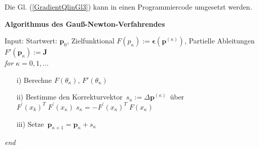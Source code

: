 Die Gl. (\ref{GradientQlinGl3}) kann in einen Programmiercode
umgesetzt werden.

\textbf{Algorithmus des Gauß-Newton-Verfahrendes}

Input: Startwert: $\boldsymbol p_0$, Zielfunktional $F(p_\kappa):= \boldsymbol\epsilon (\boldsymbol p^{(\kappa)}) $, Partielle Ableitungen $F'(\boldsymbol p_{\kappa}) := \mathbf J$ \\
\hspace*{1em}\textit{for} $\kappa = 0,1, \ldots$ \\[-3ex]
\begin{itemize}
	\item[i)] Berechne $F(\theta_\kappa)$, $F'(\theta_\kappa)$
	\item[ii)] Bestimme den Korrekturvektor~$s_\kappa := \Delta \boldsymbol p^{(\kappa)}$~über~
	$F^\prime(x_k)^T\;F^\prime(x_\kappa)\; s_\kappa = -F^\prime(x_\kappa)^T\;F(x_\kappa)$
	\item[iii)] Setze~$\boldsymbol p_{\kappa+1} = \boldsymbol p_\kappa + s_\kappa$
\end{itemize}
\hspace*{1em}\textit{end} \\

